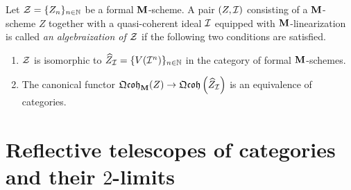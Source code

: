 \begin{definition}
Let ${\mathcal Z} = \{Z_n\}_{n\in \mathbb{N}}$ be a formal $\mathbf{M}$-scheme. A pair $(Z,{\mathcal I})$ consisting of a $\mathbf{M}$-scheme $Z$ together with a quasi-coherent ideal ${\mathcal I}$ equipped with $\mathbf{M}$-linearization is called \textit{an algebraization of ${\mathcal Z}$} if the following two conditions are satisfied.
\begin{enumerate}[label=\textbf{(\arabic*)}, leftmargin=1.5em]
\item ${\mathcal Z}$ is isomorphic to $\widehat{Z}_{{\mathcal I}} = \{V({\mathcal I}^n)\}_{n\in {\mathbb N}}$ in the category of formal $\mathbf{M}$-schemes.
\item The canonical functor $\mathfrak{Qcoh}_{\mathbf{M}}(Z)\rightarrow \mathfrak{Qcoh}\left(\widehat{Z}_{{\mathcal I}}\right)$ is an equivalence of categories.
\end{enumerate}
\end{definition}

\section{Reflective telescopes of categories and their $2$-limits}

